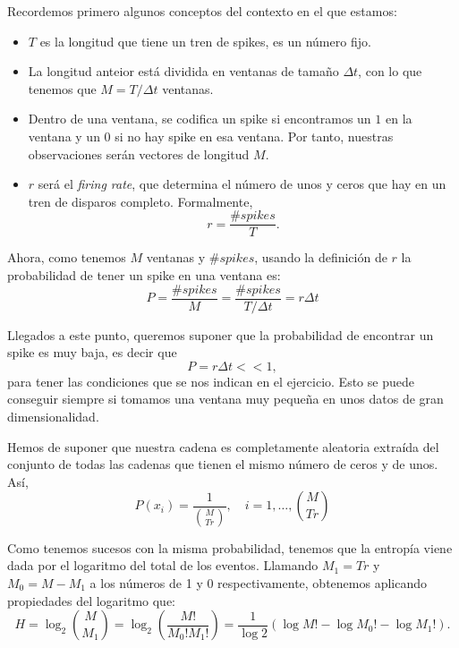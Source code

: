 \documentclass[a4paper]{article}
\begin{document}
Recordemos primero algunos conceptos del contexto en el que estamos:

\begin{itemize}
\item \(T\) es la longitud que tiene un tren de spikes, es un número fijo.
\item La longitud anteior está dividida en ventanas de tamaño \(\Delta t\), con lo que tenemos que $M = T/\Delta t$ ventanas.
\item Dentro de una ventana, se codifica un spike si encontramos un \(1\) en la ventana y un $0$ si no hay spike en esa ventana. Por tanto, nuestras observaciones serán vectores de longitud \(M\).
\item \(r\) será el \emph{firing rate}, que determina el número de unos y ceros que hay en un tren de disparos completo. Formalmente,
\[
  r = \frac{\#spikes}{T}.
  \]
\end{itemize}

Ahora, como tenemos \(M\) ventanas y \(\#spikes\), usando la definición de \(r\) la probabilidad de tener un spike en una ventana es:
\[
P = \frac{\#spikes}{M} = \frac{\#spikes}{T/\Delta t} = r \Delta t 
\]

Llegados a este punto, queremos suponer que la probabilidad de encontrar un spike es muy baja, es decir que
\[
P = r \Delta t << 1  ,
\]
para tener las condiciones que se nos indican en el ejercicio. Esto se puede conseguir siempre si tomamos una ventana muy pequeña en unos datos de gran dimensionalidad. 

Hemos de suponer que nuestra cadena es completamente aleatoria extraída del conjunto de todas las cadenas que tienen el mismo número de ceros y de unos. Así,
\[
P(x_i) = \frac{1}{{M \choose Tr}}, \quad i = 1,\dots, {M \choose Tr} 
\]

Como tenemos sucesos con la misma probabilidad, tenemos que la entropía viene dada por el logaritmo del total de los eventos. Llamando \(M_1 = Tr \) y \(M_0 = M - M_1\) a los números de 1 y 0 respectivamente, obtenemos aplicando propiedades del logaritmo que:
\[
H = \log_2 {M \choose M_1} = \log_2 \left( \frac{M!}{M_0! M_1!} \right) = \frac{1}{\log 2} \left(\log M! - \log M_0! - \log M_1 !\right).
\]
\end{document}
